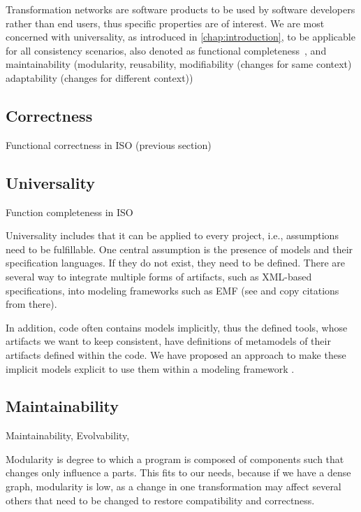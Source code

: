 Transformation networks are software products to be used by software developers rather than end users, thus specific properties are of interest.
We are most concerned with universality, as introduced in \autoref{chap:introduction}, to be applicable for all consistency scenarios, also denoted as functional completeness~\cite{iso25010}, and maintainability (modularity, reusability, modifiability (changes for same context) adaptability (changes for different context))

\subsection{Correctness}
Functional correctness in ISO
(previous section)


\subsection{Universality}
Function completeness in ISO 

Universality includes that it can be applied to every project, i.e., assumptions need to be fulfillable.
One central assumption is the presence of models and their specification languages.
If they do not exist, they need to be defined.
There are several way to integrate multiple forms of artifacts, such as XML-based specifications, into modeling frameworks such as EMF (see  and copy citations from there).

In addition, code often contains models implicitly, thus the defined tools, whose artifacts we want to keep consistent, have definitions of metamodels of their artifacts defined within the code.
We have proposed an approach to make these implicit models explicit to use them within a modeling framework .


\subsection{Maintainability}

Maintainability, Evolvability, 

Modularity is degree to which a program is composed of components such that changes only influence a parts.
This fits to our needs, because if we have a dense graph, modularity is low, as a change in one transformation may affect several others that need to be changed to restore compatibility and correctness.


